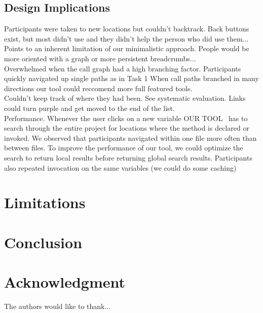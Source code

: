 \documentclass[conference]{IEEEtran}
\newcommand{\toolName}{OUR TOOL}
\begin{document}
\subsection{Design Implications}

Participants were taken to new locations but couldn't backtrack.
	Back buttons exist, but most didn't use and they didn't help the person who did use them...
	Points to an inherent limitation of our minimalistic approach. People would be more oriented with a graph or more persistent breadcrumbs...\\
Overwhelmed when the call graph had a high branching factor.
	Participants quickly navigated up single paths as in Task 1
	When call paths branched in many directions our tool could reccomend more full featured tools.\\
Couldn't keep track of where they had been.
	See systematic evaluation. Links could turn purple and get moved to the end of the list.\\
Performance.
	Whenever the user clicks on a new variable \toolName~ has to search through the entire project for locations where the method is declared or invoked. We observed that participants navigated within one file more often than between files. To improve the performance of our tool, we could optimize the search to return local results before returning global search results.	Participants also repeated invocation on the same variables (we could do some caching)


\section{Limitations}

\section{Conclusion}

\section*{Acknowledgment}

The authors would like to thank...













\end{document}
